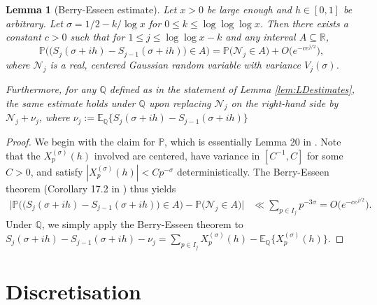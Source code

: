 \documentclass{amsart}
\newtheorem{lemma}[theorem]{Lemma}
\theoremstyle{definition}
\theoremstyle{remark}
\numberwithin{equation}{section}
\begin{document}
\begin{lemma}[Berry-Esseen estimate]\label{lem:berryesseen}  Let $x>0$ be large enough and $h\in [0,1]$ be arbitrary. Let $\sigma=1/2-k/\log x$ for $0\leq k\leq \log\log\log x$. Then there exists a constant $c>0$ such that for $1\leq j\leq \log\log x-k$ and any interval $A\subseteq \mathbb{R}$,
\[
    \mathbb{P}\Big(\big(S_j(\sigma+ih)-S_{j-1}(\sigma+ih)\big)\in A\Big)=\mathbb{P}\big(\mathcal{N}_j\in A\big)+O\big(e^{-ce^{j/2}}\big),
\]
where $\mathcal{N}_j$ is a real, centered Gaussian random variable with variance $V_j(\sigma)$.

Furthermore, for any $\mathbb{Q}$ defined as in the statement of Lemma \ref{lem:LDestimates}, the same estimate holds under $\mathbb{Q}$ upon replacing $\mathcal{N}_j$ on the right-hand side by $\mathcal{N}_j+\nu_j$, where $\nu_j:=\mathbb{E}_{\mathbb{Q}}\{S_j(\sigma+ih)-S_{j-1}(\sigma+ih)\}$
\end{lemma}
\begin{proof}
    We begin with the claim for $\mathbb{P}$, which is essentially Lemma 20 in \cite{FHK1}. Note that the $X_p^{(\sigma)}(h)$ involved are centered, have variance in $[C^{-1},C]$ for some $C>0$, and satisfy $|X_p^{(\sigma)}(h)|<Cp^{-\sigma}$ deterministically. The Berry-Esseen theorem (Corollary 17.2 in \cite{Bhattacharya}) thus yields
    \begin{align*}
         \Big|\mathbb{P}\Big(\big(S_j(\sigma+ih)-S_{j-1}(\sigma+ih)\big)\in A\Big)-\mathbb{P}\big(\mathcal{N}_j\in A\big)\Big|&\ll \sum_{p\in I_j}p^{-3\sigma}= O\big(e^{-ce^{j/2}}\big).
    \end{align*}
    Under $\mathbb{Q}$, we simply apply the Berry-Esseen theorem to $S_j(\sigma+ih)-S_{j-1}(\sigma+ih)-\nu_j=\sum_{p\in I_j} X_p^{(\sigma)}(h)-\mathbb{E}_{\mathbb{Q}}\big\{X_p^{(\sigma)}(h)\big\}$.
\end{proof}


\section{Discretisation}
\end{document}
